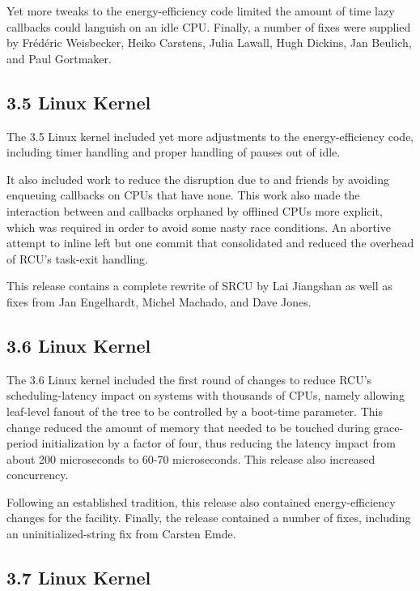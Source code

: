 Yet more tweaks to the energy-efficiency code limited the amount of
time lazy callbacks could languish on an idle CPU.
Finally, a number of fixes were supplied by Fr\'ed\'eric Weisbecker,
Heiko Carstens, Julia Lawall, Hugh Dickins, Jan Beulich, and Paul
Gortmaker.

\subsection{3.5 Linux Kernel}

The 3.5 Linux kernel included yet more adjustments to the
 energy-efficiency code, including timer
handling and proper handling of  pauses out of
idle.

It also included work to reduce the disruption due to 
and friends by avoiding enqueuing callbacks on CPUs that have none.
This work also made the interaction between  and
callbacks orphaned by offlined CPUs more explicit, which was required
in order to avoid some nasty race conditions.
An abortive attempt to inline  left but one
commit that consolidated and reduced the overhead of RCU's
task-exit handling.

This release contains a complete rewrite of SRCU by Lai Jiangshan as
well as fixes from Jan Engelhardt, Michel Machado, and Dave Jones.

\subsection{3.6 Linux Kernel}

The 3.6 Linux kernel included the first round of changes to reduce
RCU's scheduling-latency impact on systems with thousands of CPUs,
namely allowing leaf-level fanout of the  tree to be
controlled by a boot-time parameter.
This change reduced the amount of memory that needed to be touched
during grace-period initialization by a factor of four, thus reducing
the latency impact from about 200 microseconds to 60-70 microseconds.
This release also increased  concurrency.

Following an established tradition, this release also contained
energy-efficiency changes for the 
facility.
Finally, the release contained a number of fixes, including
an uninitialized-string fix from Carsten Emde.

\subsection{3.7 Linux Kernel}


